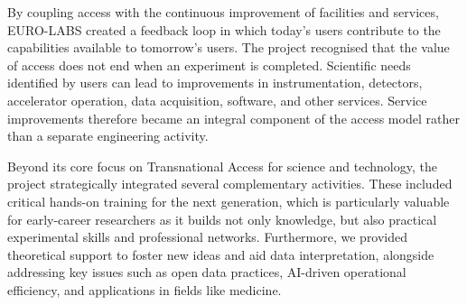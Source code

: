 
By coupling access with the continuous improvement of facilities and services, EURO-LABS created a feedback loop in which today's users contribute to the capabilities available to tomorrow's users. The project recognised that the value of access does not end when an experiment is completed. Scientific needs identified by users can lead to improvements in instrumentation, detectors, accelerator operation, data acquisition, software, and other services. Service improvements therefore became an integral component of the access model rather than a separate engineering activity.

Beyond its core focus on Transnational Access for science and technology, the project strategically integrated several complementary activities. These included critical hands-on training for the next generation, which is particularly valuable for early-career researchers as it builds not only knowledge, but also practical experimental skills and professional networks. Furthermore, we provided theoretical support to foster new ideas and aid data interpretation, alongside addressing key issues such as open data practices, AI-driven operational efficiency, and applications in fields like medicine.


